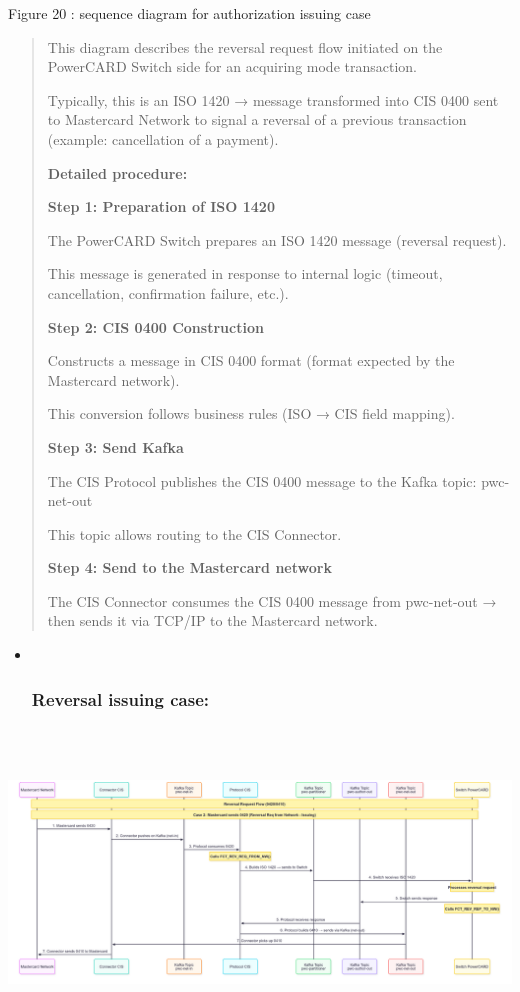 \documentclass[12pt,a4paper]{report}
\begin{document}
\protect\hypertarget{_Toc201954496}{}{}Figure 20 : sequence diagram for
authorization issuing case

\begin{quote}
This diagram describes the reversal request flow initiated on the
PowerCARD Switch side for an acquiring mode transaction.

Typically, this is an ISO 1420 → message transformed into CIS 0400 sent
to Mastercard Network to signal a reversal of a previous transaction
(example: cancellation of a payment).

\textbf{Detailed procedure:}

\textbf{Step 1: Preparation of ISO 1420}

The PowerCARD Switch prepares an ISO 1420 message (reversal request).

This message is generated in response to internal logic (timeout,
cancellation, confirmation failure, etc.).

\textbf{Step 2: CIS 0400 Construction}

Constructs a message in CIS 0400 format (format expected by the
Mastercard network).

This conversion follows business rules (ISO → CIS field mapping).

\textbf{Step 3: Send Kafka}

The CIS Protocol publishes the CIS 0400 message to the Kafka topic:
pwc-net-out

This topic allows routing to the CIS Connector.

\textbf{Step 4: Send to the Mastercard network}

The CIS Connector consumes the CIS 0400 message from pwc-net-out → then
sends it via TCP/IP to the Mastercard network.
\end{quote}

\begin{itemize}
\item ~
  \hypertarget{reversal-issuing-case}{%
  \subsubsection{\texorpdfstring{\textbf{Reversal issuing
  case:}}{Reversal issuing case:}}\label{reversal-issuing-case}}
\end{itemize}

\includegraphics[width=7.95813in,height=3.23377in]{vertopal_d1b0b2209edd4c6aa8254f57daa0953b/media/image40.png}
\end{document}
